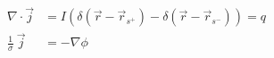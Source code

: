 \begin{equation}
\begin{aligned}
\nabla\cdot \vec{j} & = I(\delta(\vec{r}-\vec{r}_{s^+}) - \delta(\vec{r}-\vec{r}_{s^-})) = q\\
\frac{1}{\sigma}~\vec{j} &=  - \nabla \phi
\end{aligned}
\end{equation}
